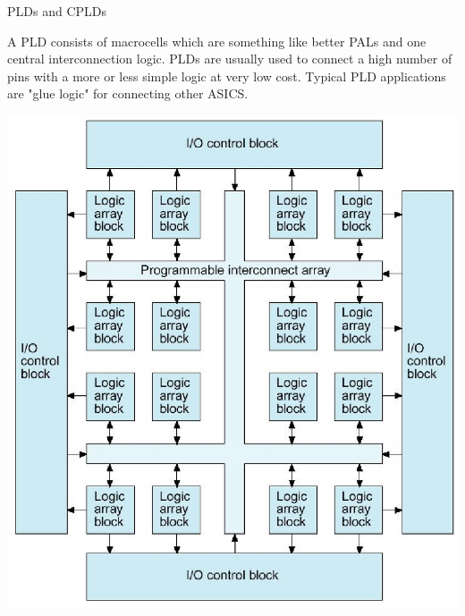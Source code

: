 \documentclass[pdf]{prosper}
\begin{document}
\begin{slide}{PLDs and CPLDs}

A PLD consists of macrocells which are something like better PALs and one
central interconnection logic. PLDs are usually used to connect a high
number of pins with a more or less simple logic at very low cost. Typical
PLD applications are "glue logic" for connecting other ASICS.

\includegraphics[scale=.45]{cpld.eps}

\end{slide}
\end{document}
